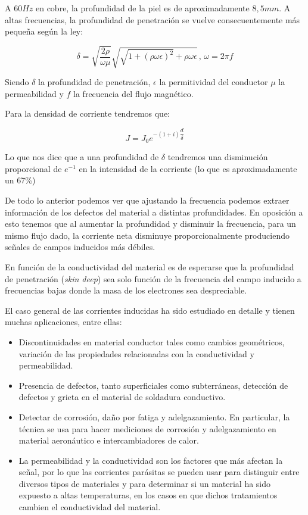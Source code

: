 A $60 Hz$ en cobre, la profundidad de la piel es de aproximadamente $8,5 mm$. A altas frecuencias, la profundidad de penetración se vuelve consecuentemente más pequeña según la ley:

\begin{equation}
	\label{eq:528}
	\delta= \sqrt{\dfrac{2\rho}{\omega\mu}}\sqrt{\sqrt{1+(\rho\omega\epsilon)^{2}}+\rho\omega\epsilon} \, , \, \omega=2\pi f
\end{equation}

Siendo $\delta$ la profundidad de penetración, $\epsilon$ la permitividad del conductor $\mu$ la permeabilidad y $f$ la frecuencia del flujo magnético.

Para la densidad de corriente tendremos que:

\begin{equation}
	\label{eq:529}
	J=J_{0}e^{-(1+i)\dfrac{d}{\delta}}
\end{equation}

Lo que nos dice que a una profundidad de $\delta$ tendremos una disminución proporcional de $e^{-1}$ en la intensidad de la corriente (lo que es aproximadamente un 67\%)

De todo lo anterior podemos ver que ajustando la frecuencia podemos extraer información de los defectos del material a distintas profundidades. En oposición a esto tenemos que al aumentar la profundidad y disminuir la frecuencia, para un mismo flujo dado, la corriente neta disminuye proporcionalmente produciendo señales de campos inducidos más débiles.

En función de la conductividad del material es de esperarse que la profundidad de penetración (\textit{skin deep}) sea solo función de la frecuencia del campo inducido a frecuencias bajas donde la masa de los electrones sea despreciable.

El caso general de las corrientes inducidas ha sido estudiado en detalle y tienen muchas aplicaciones, entre ellas:


\begin{itemize}
	\item Discontinuidades en material conductor tales como cambios geométricos, variación de las propiedades relacionadas con la conductividad y permeabilidad.
	
	\item Presencia de defectos, tanto superficiales como subterráneas, detección de defectos y grieta en el material de soldadura conductivo.
	
	\item Detectar de corrosión, daño por fatiga y adelgazamiento. En particular, la técnica se usa para hacer mediciones de corrosión y adelgazamiento en material aeronáutico e intercambiadores de calor.
	
	\item La permeabilidad y la conductividad son los factores que más afectan la señal, por lo que las corrientes parásitas se pueden usar para distinguir entre diversos tipos de materiales y para
determinar si un material ha sido expuesto a altas temperaturas, en los casos en que dichos tratamientos cambien el conductividad del material.

\end{itemize}

